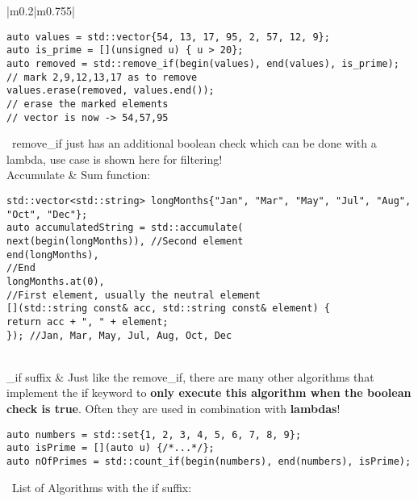 \documentclass[main.tex,fontsize=8pt,paper=a4,paper=portrait,DIV=calc]{scrartcl}
\begin{document}
\begin{table}[ht!]
\begin{tabular}{|m{0.2\linewidth}|m{0.755\linewidth}|}
\begin{lstlisting}
auto values = std::vector{54, 13, 17, 95, 2, 57, 12, 9};
auto is_prime = [](unsigned u) { u > 20};
auto removed = std::remove_if(begin(values), end(values), is_prime);
// mark 2,9,12,13,17 as to remove
values.erase(removed, values.end());
// erase the marked elements
// vector is now -> 54,57,95
\end{lstlisting} 
\, \newline
remove\_if just has an additional boolean check which can be done with a lambda, use case is shown here for filtering!\\
\hline
Accumulate & 
Sum function:\newline
\begin{lstlisting}
std::vector<std::string> longMonths{"Jan", "Mar", "May", "Jul", "Aug", "Oct", "Dec"};
auto accumulatedString = std::accumulate(
next(begin(longMonths)), //Second element
end(longMonths),
//End
longMonths.at(0),
//First element, usually the neutral element
[](std::string const& acc, std::string const& element) {
return acc + ", " + element;
}); //Jan, Mar, May, Jul, Aug, Oct, Dec
\end{lstlisting}\\
\hline
\_if suffix & 
Just like the remove\_if, there are many other algorithms that implement the if keyword to \textbf{only execute this algorithm when the boolean check is true}.\newline
Often they are used in combination with \textbf{lambdas}!
\begin{lstlisting}
auto numbers = std::set{1, 2, 3, 4, 5, 6, 7, 8, 9};
auto isPrime = [](auto u) {/*...*/};
auto nOfPrimes = std::count_if(begin(numbers), end(numbers), isPrime);
\end{lstlisting}
\, \newline
List of Algorithms with the if suffix:\newline
\minipg{
\begin{itemize}
\item \textcolor{teal}{count\_if}
\item \textcolor{teal}{find\_if}
\item \textcolor{teal}{find\_if\_not}
\item \textcolor{teal}{copy\_if}
\end{itemize} 
}{\begin{itemize}
\item \textcolor{teal}{count\_if}
\item \textcolor{teal}{find\_if}
\item \textcolor{teal}{find\_if\_not}

\end{itemize}}
\end{tabular}
\end{table}
\end{document}
